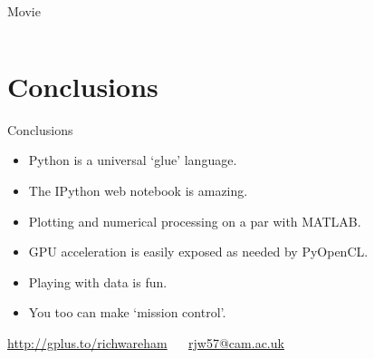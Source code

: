 \documentclass[aspectratio=169]{beamer}
\begin{document}
\begin{frame}
  \centering\Huge
  Movie
  \\
\end{frame}

\begin{frame}
  \inputminted{python}{ephem.py}
\end{frame}

\section{Conclusions}

\begin{frame}{Conclusions}
  \begin{itemize}
    \item Python is a universal `glue' language.
    \item The IPython web notebook is amazing.
    \item Plotting and numerical processing on a par with MATLAB.
    \item GPU acceleration is easily exposed as needed by PyOpenCL.
    \item Playing with data is fun.
    \item You too can make `mission control'.
  \end{itemize}
  \vspace{2\baselineskip}
  \begin{centering}
    \url{http://gplus.to/richwareham} $\quad$ \url{rjw57@cam.ac.uk}\\
  \end{centering}
\end{frame}
\end{document}
